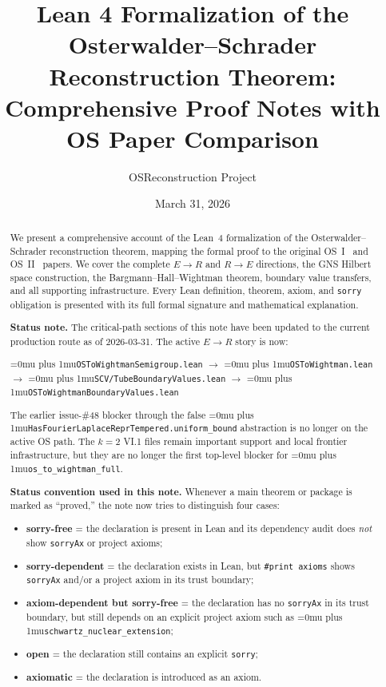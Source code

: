 \documentclass[11pt,a4paper]{article}
\title{Lean 4 Formalization of the Osterwalder--Schrader Reconstruction Theorem:\\
Comprehensive Proof Notes with OS Paper Comparison}
\author{OSReconstruction Project}
\date{March 31, 2026}
\newcommand{\sorry}{\texttt{sorry}}
\newcommand{\leanfile}[1]{\begingroup\Urlmuskip=0mu plus 1mu\relax\nolinkurl{#1}\endgroup}
\newcommand{\leanname}[1]{\begingroup\Urlmuskip=0mu plus 1mu\relax\nolinkurl{#1}\endgroup}
\begin{document}
\sloppy
\maketitle

\begin{abstract}
We present a comprehensive account of the Lean~4 formalization of the
Osterwalder--Schrader reconstruction theorem, mapping the formal proof to the
original OS~I~\cite{OS1} and OS~II~\cite{OS2} papers. We cover the complete
$E \to R$ and $R \to E$ directions, the GNS Hilbert space construction,
the Bargmann--Hall--Wightman theorem, boundary value transfers, and all
supporting infrastructure. Every Lean definition, theorem, axiom, and
\sorry{} obligation is presented with its full formal signature and
mathematical explanation.

\medskip\noindent
\textbf{Status note.} The critical-path sections of this note have been updated
to the current production route as of 2026-03-31. The active $E \to R$ story is
now:
\begin{center}
\leanfile{OSToWightmanSemigroup.lean}
$\to$
\leanfile{OSToWightman.lean}
$\to$
\leanfile{SCV/TubeBoundaryValues.lean}
$\to$
\leanfile{OSToWightmanBoundaryValues.lean}
\end{center}
The earlier issue-\#48 blocker through the false
\leanname{HasFourierLaplaceReprTempered.uniform\_bound} abstraction is no longer
on the active OS path. The $k=2$ VI.1 files remain important support and local
frontier infrastructure, but they are no longer the first top-level blocker for
\leanname{os\_to\_wightman\_full}.

\medskip\noindent
\textbf{Status convention used in this note.}
Whenever a main theorem or package is marked as ``proved,'' the note now tries to
distinguish four cases:
\begin{itemize}
\item \textbf{sorry-free} = the declaration is present in Lean and its dependency
  audit does \emph{not} show \texttt{sorryAx} or project axioms;
\item \textbf{sorry-dependent} = the declaration exists in Lean, but
  \texttt{\#print axioms} shows \texttt{sorryAx} and/or a project axiom in its trust
  boundary;
\item \textbf{axiom-dependent but sorry-free} = the declaration has no
  \texttt{sorryAx} in its trust boundary, but still depends on an explicit
  project axiom such as \leanname{schwartz\_nuclear\_extension};
\item \textbf{open} = the declaration still contains an explicit \sorry{};
\item \textbf{axiomatic} = the declaration is introduced as an axiom.
\end{itemize}


\end{abstract}
\end{document}
